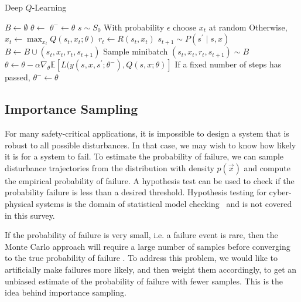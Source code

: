 \begin{algorithm}
\caption{Deep $Q$-Learning} \label{alg:dqn}
\begin{algorithmic}[1]
    \State $B \gets \emptyset$ \label{line:dqn_initialize_buffer}
    \State $\theta \gets$  \label{line:dqn_initialize_weights}
    \State $\theta^- \gets \theta$
    \Loop
        \State $s \sim S_0$ \label{line:dqn_sample_ic}
         \label{line:dqn_loop_episode}
            \State With probability $\epsilon$ choose $x_t$ at random \label{line:dqn_rand_action}
            \State Otherwise, $x_t \gets \max_{x_t} Q(s_t, x_t; \theta)$ \label{line:dqn_greedy_action}
            \State $r_t \gets R(s_t, x_t)$ \label{line:dqn_reward}
            \State $s_{t+1} \sim P(s^\prime \mid s, x)$ \label{line:dqn_next_state}
            \State $B \gets B \cup (s_t, x_t, r_t, s_{t+1})$ \label{line:dqn_save_in_replay_buffer}
            \State Sample minibatch $(s_t, x_t, r_t, s_{t+1}) \sim B$ \label{line:dqn_minibatch}
            \State $\theta \gets \theta - \alpha \nabla_{\theta} \mathbb{E}[L(y(s, x, s^\prime; \theta^-), Q(s,x; \theta)]$ \label{line:dqn_update}
            \State If a fixed number of steps has passed, $\theta^- \gets \theta$ \label{line:dqn_target_update}
        \EndWhile
    \EndLoop
    \State \Return{\theta} \label{line:dqn_return}
    \EndFunction
\end{algorithmic}
\end{algorithm}

\subsection{Importance Sampling}
\label{sec:is}
For many safety-critical applications, it is impossible to design a system that is robust to all possible disturbances. In that case, we may wish to know how likely it is for a system to fail. To estimate the probability of failure, we can sample disturbance trajectories from the distribution with density $p(\vec{x})$ and compute the empirical probability of failure. A hypothesis test can be used to check if the probability failure is less than a desired threshold. Hypothesis testing for cyber-physical systems is the domain of statistical model checking~\cite{legay2010statistical,agha2018survey} and is not covered in this survey. 

If the probability of failure is very small, i.e. a failure event is rare, then the Monte Carlo approach will require a large number of samples before converging to the true probability of failure \cite{hahn1972sample}. To address this problem, we would like to artificially make failures more likely, and then weight them accordingly, to get an unbiased estimate of the probability of failure with fewer samples. This is the idea behind importance sampling.

